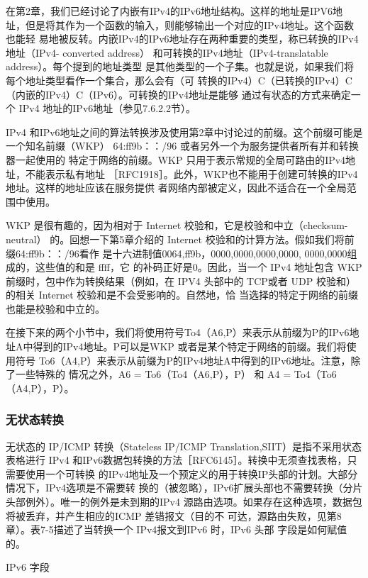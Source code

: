 在第2章，我们已经讨论了内嵌有IPv4的IPv6地址结构。这样的地址是IPV6地
址，但是将其作为一个函数的输入，则能够输出一个对应的IPv4地址。这个函数也能轻
易地被反转。内嵌IPv4的IPv6地址存在两种重要的类型，称已转换的IPv4地址（IPv4-
converted address） 和可转换的IPv4地址（IPv4-translatable address）。每个提到的地址类型
是其他类型的一个子集。也就是说，如果我们将每个地址类型看作一个集合，那么会有（可
转换的IPv4）C（已转换的IPv4）C（内嵌的IPv4）C（IPv6）。可转换的IPv4地址是能够
通过有状态的方式来确定一个 IPv4 地址的IPv6地址（参见7.6.2.2节）。

IPv4 和IPv6地址之间的算法转换涉及使用第2章中讨论过的前缀。这个前缀可能是
一个知名前缀（WKP） 64:ff9b：：/96 或者另外一个为服务提供者所有并和转换器一起使用的
特定于网络的前缀。WKP 只用于表示常规的全局可路由的IPv4地址，不能表示私有地址
［RFC1918］。此外，WKP也不能用于创建可转换的IPv4地址。这样的地址应该在服务提供
者网络内部被定义，因此不适合在一个全局范围中使用。

WKP 是很有趣的，因为相对于 Internet 校验和，它是校验和中立（checksum-neutral）
的。回想一下第5章介绍的 Internet 校验和的计算方法。假如我们将前缀64:ff9b：：/96看作
是十六进制值0064,ff9b，0000,0000,0000,0000, 0000,0000组成的，这些值的和是 ffff，它
的补码正好是0。因此，当一个 IPv4 地址包含 WKP 前缀时，包中作为转换结果（例如，在
IPV4 头部中的 TCP或者 UDP 校验和）的相关 Internet 校验和是不会受影响的。自然地，恰
当选择的特定于网络的前缀也能是校验和中立的。

在接下来的两个小节中，我们将使用符号To4（A6,P）来表示从前缀为P的IPv6地
址A中得到的IPv4地址。P可以是WKP 或者是某个特定于网络的前缀。我们将使用符号
To6（A4,P）来表示从前缀为P的IPv4地址A中得到的IPv6地址。注意，除了一些特殊的
情况之外，A6 = To6（To4（A6,P），P） 和 A4 = To4（To6（A4,P），P）。

\subsubsection{无状态转换}

无状态的 IP/ICMP 转换（Stateless IP/ICMP Translation,SIIT）是指不采用状态表格进行
IPv4 和IPv6数据包转换的方法［RFC6145］。转换中无须查找表格，只需要使用一个可转换
的IPv4地址及一个预定义的用于转换IP头部的计划。大部分情况下，IPv4选项是不需要转
换的（被忽略），IPv6扩展头部也不需要转换（分片头部例外）。唯一的例外是未到期的IPv4
源路由选项。如果存在这种选项，数据包将被丢弃，并产生相应的ICMP 差错报文（目的不
可达，源路由失败，见第8章）。表7-5描述了当转换一个 IPv4报文到IPv6 时，IPv6 头部
字段是如何赋值的。

IPv6 字段

